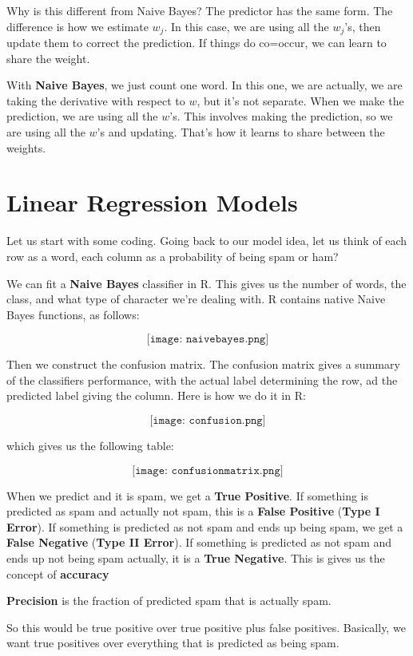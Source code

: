 Why is this different from Naive Bayes? The predictor has the same form. The difference is how we estimate $w_j$. In this case, we are using all the $w_j$'s, then update them to correct the prediction. If things do co=occur, we can learn to share the weight. 

With \textbf{Naive Bayes}, we just count one word. In this one, we are actually, we are taking the derivative with respect to $w$, but it's not separate. When we make the prediction, we are using all the $w$'s. This involves making the prediction, so we are using all the $w$'s and updating. That's how it learns to share between the weights.

\section{Linear Regression Models}

Let us start with some coding. Going back to our model idea, let us think of each row as a word, each column as a probability of being spam or ham?

We can fit a \textbf{Naive Bayes} classifier in R. This gives us the number of words, the class, and what type of character we're dealing with. R contains native Naive Bayes functions, as follows:

$$\texttt{[image: naivebayes.png]}$$

Then we construct the confusion matrix. The confusion matrix gives a summary of the classifiers performance, with the actual label determining the row, ad the predicted label giving the column. Here is how we do it in R:

$$\texttt{[image: confusion.png]}$$

which gives us the following table:

$$\texttt{[image: confusionmatrix.png]}$$

When we predict and it is spam, we get a \textbf{True Positive}. If something is predicted as spam and actually not spam, this is a \textbf{False Positive} (\textbf{Type I Error}). If something is predicted as not spam and ends up being spam, we get a \textbf{False Negative} (\textbf{Type II Error}). If something is predicted as not spam and ends up not being spam actually, it is a \textbf{True Negative}. This is gives us the concept of \textbf{accuracy}

\textbf{Precision} is the fraction of predicted spam that is actually spam. 

So this would be true positive over true positive plus false positives. Basically, we want true positives over everything that is predicted as being spam. 

